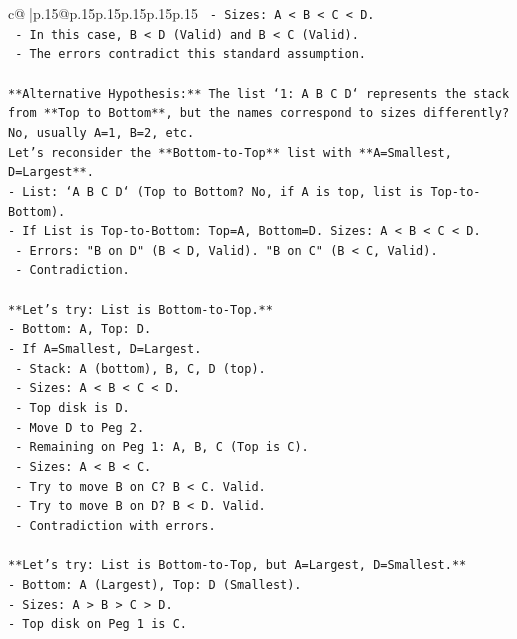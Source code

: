 \documentclass{article}
\begin{document}
{\begin{supertabular}{c@{$\;$}|p{.15\linewidth}@{}p{.15\linewidth}p{.15\linewidth}p{.15\linewidth}p{.15\linewidth}p{.15\linewidth}}
{{{\texttt{  {-} Sizes: A < B < C < D.} \\
\texttt{  {-} In this case, B < D (Valid) and B < C (Valid).} \\
\texttt{  {-} The errors contradict this standard assumption.} \\
\\ 
\texttt{**Alternative Hypothesis:** The list `1: A B C D` represents the stack from **Top to Bottom**, but the names correspond to sizes differently?} \\
\texttt{No, usually A=1, B=2, etc.} \\
\texttt{Let's reconsider the **Bottom{-}to{-}Top** list with **A=Smallest, D=Largest**.} \\
\texttt{{-} List: `A B C D` (Top to Bottom? No, if A is top, list is Top{-}to{-}Bottom).} \\
\texttt{{-} If List is Top{-}to{-}Bottom: Top=A, Bottom=D. Sizes: A < B < C < D.} \\
\texttt{  {-} Errors: "B on D" (B < D, Valid). "B on C" (B < C, Valid).} \\
\texttt{  {-} Contradiction.} \\
\\ 
\texttt{**Let's try: List is Bottom{-}to{-}Top.**} \\
\texttt{{-} Bottom: A, Top: D.} \\
\texttt{{-} If A=Smallest, D=Largest.} \\
\texttt{  {-} Stack: A (bottom), B, C, D (top).} \\
\texttt{  {-} Sizes: A < B < C < D.} \\
\texttt{  {-} Top disk is D.} \\
\texttt{  {-} Move D to Peg 2.} \\
\texttt{  {-} Remaining on Peg 1: A, B, C (Top is C).} \\
\texttt{  {-} Sizes: A < B < C.} \\
\texttt{  {-} Try to move B on C? B < C. Valid.} \\
\texttt{  {-} Try to move B on D? B < D. Valid.} \\
\texttt{  {-} Contradiction with errors.} \\
\\ 
\texttt{**Let's try: List is Bottom{-}to{-}Top, but A=Largest, D=Smallest.**} \\
\texttt{{-} Bottom: A (Largest), Top: D (Smallest).} \\
\texttt{{-} Sizes: A > B > C > D.} \\
\texttt{{-} Top disk on Peg 1 is C.} \\
}}}
\end{supertabular}}
\end{document}
